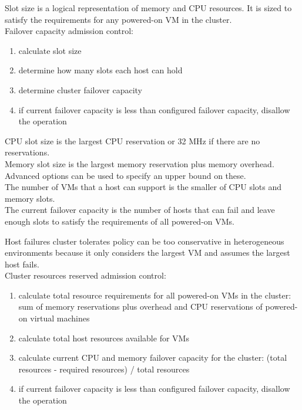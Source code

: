 Slot size is a logical representation of memory and CPU resources. It is sized
to satisfy the requirements for any powered-on VM in the cluster.\\

Failover capacity admission control:

\begin{enumerate}
\item calculate slot size
\item determine how many slots each host can hold
\item determine cluster failover capacity
\item if current failover capacity is less than configured failover capacity,
disallow the operation
\end{enumerate}

CPU slot size is the largest CPU reservation or 32 MHz if there are no
reservations.\\

Memory slot size is the largest memory reservation plus memory overhead.\\

Advanced options can be used to specify an upper bound on these.\\

The number of VMs that a host can support is the smaller of CPU slots and
memory slots.\\

The current failover capacity is the number of hosts that can
fail and leave enough slots to satisfy the requirements of all powered-on
VMs.

Host failures cluster tolerates policy can be too conservative in
heterogeneous environments because it only considers the largest VM and assumes
the largest host fails.\\

Cluster resources reserved admission control:

\begin{enumerate}

\item calculate total resource requirements for all powered-on VMs in the
cluster: sum of memory reservations plus overhead and CPU reservations of
powered-on virtual machines

\item calculate total host resources available for VMs

\item calculate current CPU and memory failover capacity for the cluster:
(total resources - required resources) / total resources

\item if current failover capacity is less than configured failover capacity,
disallow the operation

\end{enumerate}

